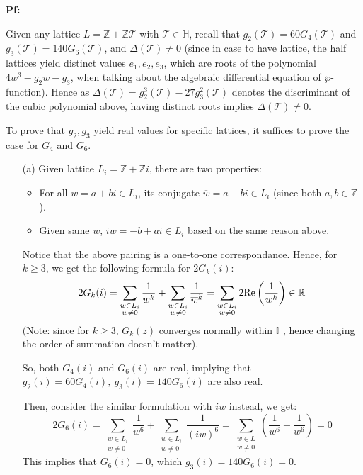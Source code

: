 \documentclass{article}
\begin{document}
\textbf{Pf:}

Given any lattice $L=\mathbb{Z}+\mathbb{Z}\mathcal{T}$ with $\mathcal{T}\in\mathbb{H}$, recall that $g_2(\mathcal{T}) = 60G_4(\mathcal{T})$ and $g_3(\mathcal{T})=140G_6(\mathcal{T})$, and $\Delta(\mathcal{T}) \neq 0$ (since in case to have lattice, the half lattices yield distinct values $e_1,e_2,e_3$, which are roots of the polynomial $4w^3-g_2w-g_3$, when talking about the algebraic differential equation of $\wp$-function). Hence as $\Delta(\mathcal{T})=g_2^3(\mathcal{T})-27g_3^2(\mathcal{T})$ denotes the discriminant of the cubic polynomial above, having distinct roots implies $\Delta(\mathcal{T})\neq 0$.

To prove that $g_2,g_3$ yield real values for specific lattices, it suffices to prove the case for $G_4$ and $G_6$.
\begin{itemize}
    \item[(a)] Given lattice $L_i = \mathbb{Z}+\mathbb{Z}i$, there are two properties:
    \begin{itemize}
        \item For all $w=a+bi\in L_i$, its conjugate $\overline{w}=a-bi\in L_i$ (since both $a,b\in\mathbb{Z}$).
        \item Given same $w$, $iw = -b+ai \in L_i$ based on the same reason above.
    \end{itemize}
    Notice that the above pairing is a one-to-one correspondance. Hence, for $k\geq 3$, we get the following formula for $2G_k(i)$:
    $$2G_k(i) = \sum_{\substack{w\in L_i\\w\neq 0}}\frac{1}{w^k}+\sum_{\substack{w\in L_i\\w\neq 0}}\frac{1}{\overline{w}^k} = \sum_{\substack{w\in L_i\\w\neq 0}}2\textmd{Re}\left(\frac{1}{w^k}\right)\in \mathbb{R}$$
    (Note: since for $k\geq 3$, $G_k(z)$ converges normally within $\mathbb{H}$, hence changing the order of summation doesn't matter).

    So, both $G_4(i)$ and $G_6(i)$ are real, implying that $g_2(i)=60G_4(i),\ g_3(i)=140G_6(i)$ are also real.

    Then, consider the similar formulation with $iw$ instead, we get:
    $$2G_6(i) = \sum_{\substack{w\in L_i\\w\neq 0}}\frac{1}{w^6}+\sum_{\substack{w\in L_i\\w\neq 0}}\frac{1}{(iw)^6} = \sum_{\substack{w\in L\\w\neq 0}}\left(\frac{1}{w^6}-\frac{1}{w^6}\right) = 0$$
    This implies that $G_6(i) = 0$, which $g_3(i) = 140G_6(i)=0$.


\end{itemize}
\end{document}
